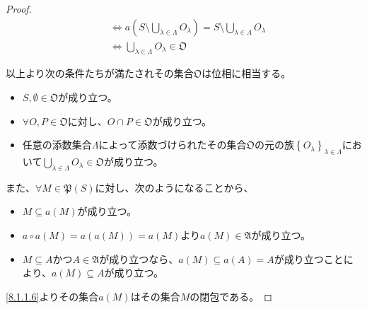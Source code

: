 \documentclass[dvipdfmx]{jsarticle}
\begin{document}
\begin{proof}
\begin{align*}
&\Leftrightarrow a\left( S \setminus \bigcup_{\lambda \in \varLambda} O_{\lambda} \right) = S \setminus \bigcup_{\lambda \in \varLambda} O_{\lambda}\\
&\Leftrightarrow \bigcup_{\lambda \in \varLambda} O_{\lambda}\in \mathfrak{O}
\end{align*}\par
以上より次の条件たちが満たされその集合$\mathfrak{O}$は位相に相当する。
\begin{itemize}
\item
  $S,\emptyset \in \mathfrak{O}$が成り立つ。
\item
  $\forall O,P \in \mathfrak{O}$に対し、$O \cap P \in \mathfrak{O}$が成り立つ。
\item
  任意の添数集合$\varLambda$によって添数づけられたその集合$\mathfrak{O}$の元の族$\left\{ O_{\lambda} \right\}_{\lambda \in \varLambda}$において$\bigcup_{\lambda \in \varLambda} O_{\lambda}\in \mathfrak{O}$が成り立つ。
\end{itemize}\par
また、$\forall M \in \mathfrak{P}(S)$に対し、次のようになることから、
\begin{itemize}
\item
  $M \subseteq a(M)$が成り立つ。
\item
  $a \circ a(M) = a\left( a(M) \right) = a(M)$より$a(M)\in \mathfrak{A}$が成り立つ。
\item
  $M \subseteq A$かつ$A \in \mathfrak{A}$が成り立つなら、$a(M) \subseteq a(A) = A$が成り立つことにより、$a(M) \subseteq A$が成り立つ。
\end{itemize}
\ref{8.1.1.6}よりその集合$a(M)$はその集合$M$の閉包である。
\end{proof}
\end{document}
